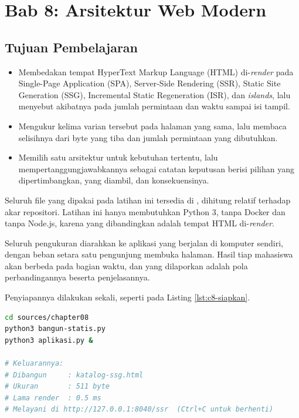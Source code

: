 \section{Bab 8: Arsitektur Web Modern}

\subsection*{Tujuan Pembelajaran}
\begin{itemize}
  \item Membedakan tempat HyperText Markup Language (HTML) di-\textit{render} pada Single-Page Application (SPA), Server-Side Rendering (SSR), Static Site Generation (SSG), Incremental Static Regeneration (ISR), dan
        \textit{islands}, lalu menyebut akibatnya pada jumlah permintaan dan
        waktu sampai isi tampil.
  \item Mengukur kelima varian tersebut pada halaman yang sama, lalu membaca
        selisihnya dari byte yang tiba dan jumlah permintaan yang dibutuhkan.
  \item Memilih satu arsitektur untuk kebutuhan tertentu, lalu
        mempertanggungjawabkannya sebagai catatan keputusan berisi pilihan
        yang dipertimbangkan, yang diambil, dan konsekuensinya.
\end{itemize}

Seluruh file yang dipakai pada latihan ini tersedia di
, dihitung relatif terhadap akar repositori.
Latihan ini hanya membutuhkan Python 3, tanpa Docker dan tanpa Node.js,
karena yang dibandingkan adalah tempat HTML di-\textit{render}.

Seluruh pengukuran diarahkan ke aplikasi yang berjalan di komputer sendiri,
dengan beban setara satu pengunjung membuka halaman. Hasil tiap mahasiswa
akan berbeda pada bagian waktu, dan yang dilaporkan adalah pola
perbandingannya beserta penjelasannya.

Penyiapannya dilakukan sekali, seperti pada Listing \ref{lst:c8-siapkan}.

\begin{lstlisting}[language=bash, caption={Membangun halaman statis lalu menyalakan server, memakai \berkas{sources/chapter08/bangun-statis.py}}, label={lst:c8-siapkan}]
cd sources/chapter08
python3 bangun-statis.py
python3 aplikasi.py &

# Keluarannya:
# Dibangun     : katalog-ssg.html
# Ukuran       : 511 byte
# Lama render  : 0.5 ms
# Melayani di http://127.0.0.1:8040/ssr  (Ctrl+C untuk berhenti)
\end{lstlisting}

